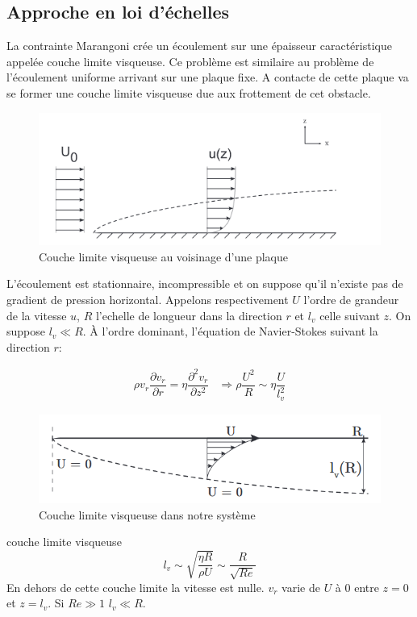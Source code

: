 \documentclass[french, 10pt]{article}
\begin{document}
\subsection{Approche en loi d'échelles}

La contrainte Marangoni crée un écoulement sur une épaisseur caractéristique appelée couche limite visqueuse. Ce problème est similaire au problème de l'écoulement uniforme arrivant sur une plaque fixe. A contacte de cette plaque va se former une couche limite visqueuse due aux frottement de cet obstacle. 

\begin{figure}[ht]
  \centering
  \includegraphics[width=.5\textwidth]{Couchelimitesvisqueuse.png}
  \caption{Couche limite visqueuse au voisinage d'une plaque}
\end{figure}
L'écoulement est stationnaire, incompressible et on suppose qu'il n'existe pas de gradient de pression
horizontal. Appelons respectivement $U$ l'ordre de grandeur de la vitesse $u$, $R$ l'echelle de longueur dans la direction $r$ et $l_v$ celle suivant $z$. On suppose $l_v\ll R$. À l'ordre dominant, l'équation de Navier-Stokes suivant la direction $r$:

\begin{equation}
  \begin{array}{cc}
    \rho v_r \dfrac{\partial v_r}{\partial r}=\eta\dfrac{\partial^2 v_r}{\partial z^2} & \Rightarrow \rho\dfrac{U^2}{R}\sim \eta \dfrac{U}{l_v^2}
  \end{array}
\end{equation}
\begin{figure}[ht]
  \centering
  \includegraphics[width=.5\textwidth]{Couchelimitesvisqueuse_marangoni.png}
  \caption{Couche limite visqueuse dans notre système}
\end{figure}

\begin{Programme}{couche limite visqueuse}
  \begin{equation}
    l_v \sim \sqrt{\dfrac{\eta R}{\rho U}}\sim\dfrac{R}{\sqrt{Re}}
  \end{equation}
En dehors de cette couche limite la vitesse est nulle. $v_r$ varie de $U$ à 0 entre $z=0$ et $z= l_v$. Si $Re\gg 1$ $l_v\ll R$.
\end{Programme}
\end{document}
